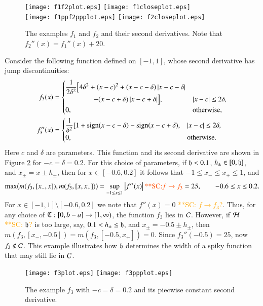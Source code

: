 \documentclass[review]{elsarticle}
\theoremstyle{definition}
\newcommand{\scnote}[1]{ {\textcolor{orange}  {\mbox{**SC:} #1}}}
\begin{document}
\begin{figure}[t]
\centering
\texttt{[image: f1f2plot.eps]} \qquad
\texttt{[image: f1closeplot.eps]} \\
\texttt{[image: f1ppf2ppplot.eps]} \qquad
\texttt{[image: f2closeplot.eps]}
\caption{The examples $f_1$ and $f_2$ and their second derivatives. Note that
$f_2''(x) = f_1''(x) + 20$.}
\label{f1f2fig}
\end{figure}

Consider the following function defined on $[-1,1]$, whose second derivative has jump discontinuities:
\begin{align*}
f_3(x) & = \begin{cases} \displaystyle 
   \frac{1}{2\delta^2} \Bigl [4 \delta^2 + (x-c)^2 + (x-c-\delta)\left \lvert x-c-\delta \right \rvert 
\\ \qquad \qquad
    - (x-c+\delta)\left \lvert x-c+\delta \right \rvert \Bigr ], & \left \lvert x-c \right \rvert \le 2\delta, 
\\ 0, & \text{otherwise},
\end{cases} \\
f''_3(x) & = 
\begin{cases} \displaystyle 
    \frac{1}{\delta^2} [1 + \operatorname{sign}(x-c-\delta) - \operatorname{sign}(x-c+\delta), & \left \lvert x-c \right \rvert \le 2\delta, 
\\ 0, & \text{otherwise}.
\end{cases}
\end{align*}
Here $c$ and $\delta$ are parameters. This function and its second derivative
are shown in Figure \ref{f3fig} for $-c=\delta = 0.2$. For this choice of
parameters, if $\mathfrak{h} < 0.1$, $h_\pm \in [0,\mathfrak{h}]$, and $x_\pm = x\pm h_\pm$, then
for $x \in [-0.6, 0.2]$ it follows that $-1 \le x_- \le x_+ \le 1$, and
\[
\max\bigl(m(f_3,[x_-,x]),m(f_3,[x,x_+])\bigr) = \sup_{-1 \le x \le 1} \abs{f''(x)} \scnote{f \rightarrow f_3} = 25, \qquad -0.6 \le x \le 0.2.
\]
For $x \in [-1,1] \setminus [-0.6, 0.2]$ we note that $f''(x) = 0$\scnote{$f \rightarrow f_3$?}. Thus, for
any choice of $\mathfrak{C} : [0,b-a] \to [1,\infty)$, the function $f_3$ lies in $\mathcal{C}$.
However, if $\mathcal{H}$ \scnote{$\mathfrak{h}$?}  is too large, say, $0.1 < h_\pm \le \mathfrak{h}$, and $x_\pm = -0.5\pm
h_\pm$, then $m(f_3,[x_-,-0.5])=m(f_3,[-0.5,x_+])=0$. Since $f_3''(-0.5) = 25$,
now $f_3 \notin \mathcal{C}$. This example illustrates how $\mathfrak{h}$ determines the width of
a spiky function that may still lie in $\mathcal{C}$.

\begin{figure}[t]
\centering
\texttt{[image: f3plot.eps]} \qquad
\texttt{[image: f3ppplot.eps]} 
\caption{The example $f_3$ with $-c=\delta = 0.2$  and its piecwise constant second derivative.}
\label{f3fig}
\end{figure}
\end{document}
